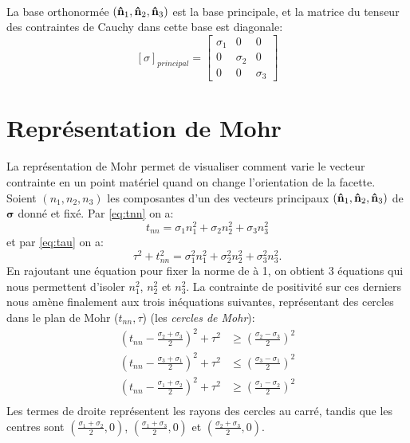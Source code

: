\paragraph{}
La base orthonormée $(\textbf{\^n}_1,\textbf{\^n}_2,\textbf{\^n}_3)$ est la base principale, et la matrice du tenseur des contraintes de Cauchy dans cette base est diagonale:
$$[\sigma]_{principal}=\left[
\begin{array}{ccc}
\sigma_1&0&0\\
0&\sigma_2&0\\
0&0&\sigma_3
\end{array}\right]$$

\section{Représentation de Mohr}
La représentation de Mohr permet de visualiser comment varie le vecteur contrainte en un point matériel quand on change l'orientation de la facette. Soient $(n_1, n_2, n_3)$ les composantes d'un des vecteurs principaux $(\textbf{\^n}_1,\textbf{\^n}_2,\textbf{\^n}_3)$ de $\boldsymbol{\sigma}$ donné et fixé. Par \ref{eq:tnn} on a:
$$t_{nn}=\sigma_1n_1^2+\sigma_2n_2^2+\sigma_3n_3^2$$ et par \ref{eq:tau} on a:
$$\tau^2+t_{nn}^2=\sigma_1^2 n_1^2+\sigma_2^2 n_2^2+\sigma_3^2 n_3^2.$$ En rajoutant une équation pour fixer la norme de  à 1, on obtient 3 équations qui nous permettent d'isoler $n_1^2$, $n_2^2$ et $n_3^2$. La contrainte de positivité sur ces derniers nous amène finalement aux trois inéquations suivantes, représentant des cercles dans le plan de Mohr ($t_{nn},\tau$) (les \emph{cercles de Mohr}):
$$\begin{aligned}
  \left(t_{nn}-\frac{\sigma_2+\sigma_3}{2}\right)^2+\tau^2&\geq \left(\frac{\sigma_2-\sigma_3}{2}\right)^2\\
  \left(t_{nn}-\frac{\sigma_3+\sigma_1}{2}\right)^2+\tau^2&\leq \left(\frac{\sigma_3-\sigma_1}{2}\right)^2\\
  \left(t_{nn}-\frac{\sigma_1+\sigma_2}{2}\right)^2+\tau^2&\geq \left(\frac{\sigma_1-\sigma_2}{2}\right)^2\\
\end{aligned}$$
Les termes de droite représentent les rayons des cercles au carré, tandis que les centres sont $\left(\frac{\sigma_1+\sigma_2}{2},0\right)$, $\left(\frac{\sigma_1+\sigma_3}{2},0\right)$ et $\left(\frac{\sigma_2+\sigma_3}{2},0\right)$.
